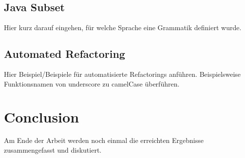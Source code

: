 \subsection{Java Subset}

Hier kurz darauf eingehen, für welche Sprache eine Grammatik definiert wurde.

\subsection{Automated Refactoring}

Hier Beispiel/Beispiele für automatisierte Refactorings anführen. Beispielsweise Funktionsnamen von underscore zu camelCase überführen.

\section{Conclusion}

Am Ende der Arbeit werden noch einmal die erreichten Ergebnisse
zusammengefasst und diskutiert.
